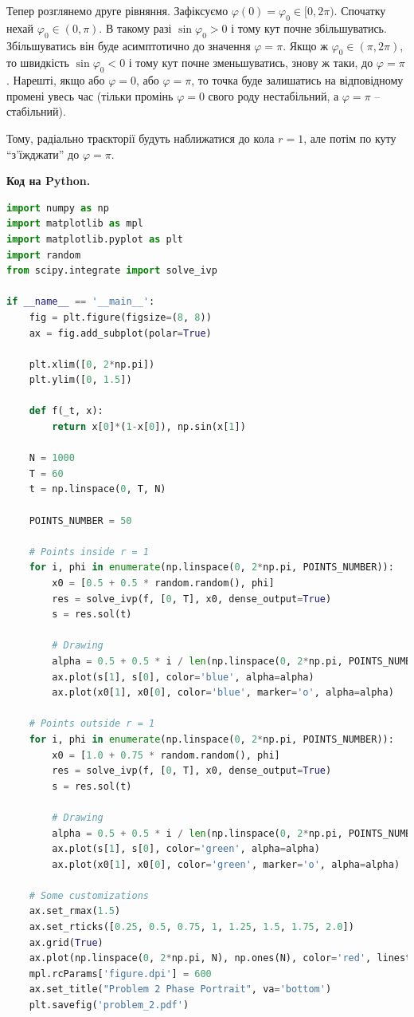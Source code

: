 \documentclass[oneside,solution]{tmpl}
\begin{document}
Тепер розглянемо друге рівняння. Зафіксуємо $\varphi(0)=\varphi_0 \in [0,2\pi)$. Спочатку нехай $\varphi_0 \in (0,\pi)$. В такому разі $\sin \varphi_0>0$ і тому кут почне збільшуватись. Збільшуватись він буде асимптотично до значення $\varphi=\pi$. Якщо ж $\varphi_0 \in (\pi,2\pi)$, то швидкість $\sin \varphi_0 < 0$ і тому кут почне зменьшуватись, знову ж таки, до $\varphi=\pi$. Нарешті, якщо або $\varphi=0$, або $\varphi=\pi$, то точка буде залишатись на відповідному промені увесь час (тільки промінь $\varphi=0$ свого роду нестабільний, а $\varphi=\pi$ -- стабільний). 

Тому, радіально траєкторії будуть наближатися до кола $r=1$, але потім по куту ``з'їжджати'' до $\varphi=\pi$.

\textbf{Код на Python.} 
\begin{lstlisting}[language=Python]
import numpy as np
import matplotlib as mpl
import matplotlib.pyplot as plt
import random
from scipy.integrate import solve_ivp

if __name__ == '__main__':
    fig = plt.figure(figsize=(8, 8))
    ax = fig.add_subplot(polar=True)

    plt.xlim([0, 2*np.pi])  
    plt.ylim([0, 1.5])  

    def f(_t, x):
        return x[0]*(1-x[0]), np.sin(x[1])

    N = 1000
    T = 60
    t = np.linspace(0, T, N)

    POINTS_NUMBER = 50
    
    # Points inside r = 1
    for i, phi in enumerate(np.linspace(0, 2*np.pi, POINTS_NUMBER)):
        x0 = [0.5 + 0.5 * random.random(), phi]
        res = solve_ivp(f, [0, T], x0, dense_output=True)
        s = res.sol(t)
        
        # Drawing
        alpha = 0.5 + 0.5 * i / len(np.linspace(0, 2*np.pi, POINTS_NUMBER))
        ax.plot(s[1], s[0], color='blue', alpha=alpha)
        ax.plot(x0[1], x0[0], color='blue', marker='o', alpha=alpha)
    
    # Points outside r = 1
    for i, phi in enumerate(np.linspace(0, 2*np.pi, POINTS_NUMBER)):
        x0 = [1.0 + 0.75 * random.random(), phi]
        res = solve_ivp(f, [0, T], x0, dense_output=True)
        s = res.sol(t)
        
        # Drawing
        alpha = 0.5 + 0.5 * i / len(np.linspace(0, 2*np.pi, POINTS_NUMBER))
        ax.plot(s[1], s[0], color='green', alpha=alpha)
        ax.plot(x0[1], x0[0], color='green', marker='o', alpha=alpha)
    
    # Some customizations
    ax.set_rmax(1.5)
    ax.set_rticks([0.25, 0.5, 0.75, 1, 1.25, 1.5, 1.75, 2.0])
    ax.grid(True)
    ax.plot(np.linspace(0, 2*np.pi, N), np.ones(N), color='red', linestyle='dashed')
    mpl.rcParams['figure.dpi'] = 600 
    ax.set_title("Problem 2 Phase Portrait", va='bottom') 
    plt.savefig('problem_2.pdf')    
\end{lstlisting}
\end{document}
